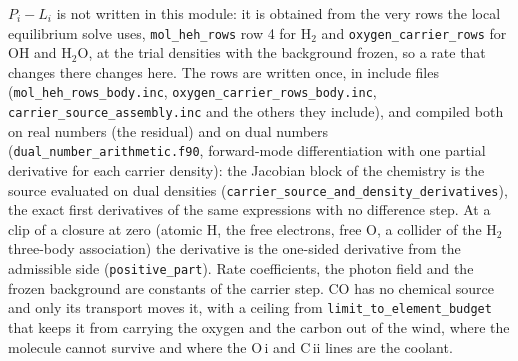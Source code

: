 $P_i-L_i$ is not written in this module: it is obtained from the very
rows the local equilibrium solve uses, \texttt{mol\_heh\_rows} row 4 for
H$_2$ and \texttt{oxygen\_carrier\_rows} for OH and H$_2$O, at the trial
densities with the background frozen, so a rate that changes there changes
here.  The rows are written once, in include files
(\texttt{mol\_heh\_rows\_body.inc}, \texttt{oxygen\_carrier\_rows\_body.inc},
\texttt{carrier\_source\_assembly.inc} and the others they include), and
compiled both on real numbers (the residual) and on dual numbers
(\texttt{dual\_number\_arithmetic.f90}, forward-mode differentiation with one
partial derivative for each carrier density): the Jacobian block of the
chemistry is the source evaluated on dual densities
(\texttt{carrier\_source\_and\_density\_derivatives}), the exact first
derivatives of the same expressions with no difference step.  At a clip of a
closure at zero (atomic H, the free electrons, free O, a collider of the
H$_2$ three-body association) the derivative is the one-sided derivative from
the admissible side (\texttt{positive\_part}).  Rate coefficients, the photon
field and the frozen background are constants of the carrier step.
CO has no chemical source and only its transport moves it, with a ceiling
from \texttt{limit\_to\_element\_budget} that keeps it from carrying the
oxygen and the carbon out of the wind, where the molecule cannot survive and
where the O\,{\sc i} and C\,{\sc ii} lines are the coolant.

